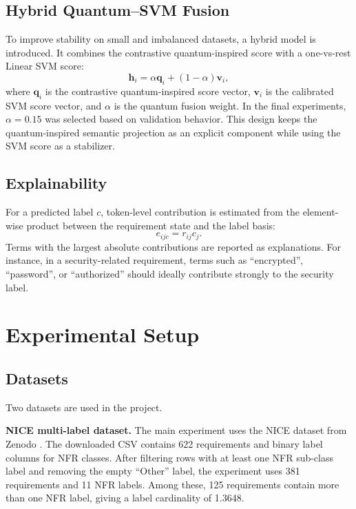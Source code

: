 \documentclass[conference]{IEEEtran}
\begin{document}
\subsection{Hybrid Quantum--SVM Fusion}
To improve stability on small and imbalanced datasets, a hybrid model is introduced. It combines the contrastive quantum-inspired score with a one-vs-rest Linear SVM score:
\begin{equation}
    \mathbf{h}_i = \alpha \mathbf{q}_i + (1-\alpha)\mathbf{v}_i,
\end{equation}
where $\mathbf{q}_i$ is the contrastive quantum-inspired score vector, $\mathbf{v}_i$ is the calibrated SVM score vector, and $\alpha$ is the quantum fusion weight. In the final experiments, $\alpha=0.15$ was selected based on validation behavior. This design keeps the quantum-inspired semantic projection as an explicit component while using the SVM score as a stabilizer.

\subsection{Explainability}
For a predicted label $c$, token-level contribution is estimated from the element-wise product between the requirement state and the label basis:
\begin{equation}
    e_{ijc} = r_{ij}c_j.
\end{equation}
Terms with the largest absolute contributions are reported as explanations. For instance, in a security-related requirement, terms such as ``encrypted'', ``password'', or ``authorized'' should ideally contribute strongly to the security label.

\section{Experimental Setup}
\subsection{Datasets}
Two datasets are used in the project.

\textbf{NICE multi-label dataset.} The main experiment uses the NICE dataset from Zenodo \cite{nice_dataset}. The downloaded CSV contains 622 requirements and binary label columns for NFR classes. After filtering rows with at least one NFR sub-class label and removing the empty ``Other'' label, the experiment uses 381 requirements and 11 NFR labels. Among these, 125 requirements contain more than one NFR label, giving a label cardinality of 1.3648.
\end{document}
